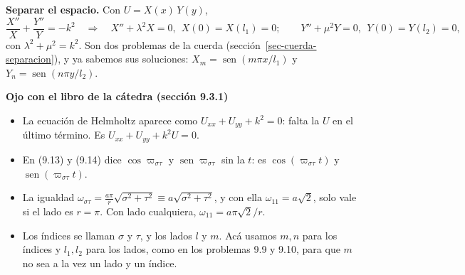 \documentclass[
  spanish,
  a4paper,
]{scrbook}
\providecommand{\tightlist}{%
  \setlength{\itemsep}{0pt}\setlength{\parskip}{0pt}}
\theoremstyle{definition}
\theoremstyle{plain}
\theoremstyle{definition}
\theoremstyle{plain}
\theoremstyle{definition}
\theoremstyle{remark}
\begin{document}
\textbf{Separar el espacio.} Con \(U = X(x)\,Y(y)\), \[
\frac{X''}{X} + \frac{Y''}{Y} = -k^2 \quad\Longrightarrow\quad
X'' + \lambda^2X = 0,\ \ X(0)=X(l_1)=0; \qquad Y'' + \mu^2Y = 0,\ \ Y(0)=Y(l_2)=0,
\] con \(\lambda^2+\mu^2 = k^2\). Son dos problemas de la cuerda
(sección~\ref{sec-cuerda-separacion}), y ya sabemos sus soluciones:
\(X_m = \operatorname{sen}(m\pi x/l_1)\) y
\(Y_n = \operatorname{sen}(n\pi y/l_2)\).

\begin{tcolorbox}[enhanced jigsaw, arc=.35mm, bottomrule=.15mm, breakable, colback=white, colframe=quarto-callout-warning-color-frame, left=2mm, leftrule=.75mm, opacityback=0, rightrule=.15mm, toprule=.15mm]
\begin{minipage}[t]{5.5mm}
\textcolor{quarto-callout-warning-color}{\faExclamationTriangle}
\end{minipage}%
\begin{minipage}[t]{\textwidth - 5.5mm}

\vspace{-3mm}\textbf{Ojo con el libro de la cátedra (sección 9.3.1)}\vspace{3mm}

\begin{itemize}
\tightlist
\item
  La ecuación de Helmholtz aparece como \(U_{xx}+U_{yy}+k^2 = 0\): falta
  la \(U\) en el último término. Es \(U_{xx} + U_{yy} + k^2U = 0\).
\item
  En (9.13) y (9.14) dice \(\cos\varpi_{\sigma\tau}\) y
  \(\operatorname{sen}\varpi_{\sigma\tau}\) sin la \(t\): es
  \(\cos(\varpi_{\sigma\tau}t)\) y
  \(\operatorname{sen}(\varpi_{\sigma\tau}t)\).
\item
  La igualdad
  \(\omega_{\sigma\tau} = \tfrac{a\pi}{r}\sqrt{\sigma^2+\tau^2}\equiv a\sqrt{\sigma^2+\tau^2}\),
  y con ella \(\omega_{11} = a\sqrt2\), solo vale si el lado es
  \(r = \pi\). Con lado cualquiera, \(\omega_{11} = a\pi\sqrt2/r\).
\item
  Los índices se llaman \(\sigma\) y \(\tau\), y los lados \(l\) y
  \(m\). Acá usamos \(m,n\) para los índices y \(l_1,l_2\) para los
  lados, como en los problemas 9.9 y 9.10, para que \(m\) no sea a la
  vez un lado y un índice.
\end{itemize}

\end{minipage}%
\end{tcolorbox}
\end{document}
